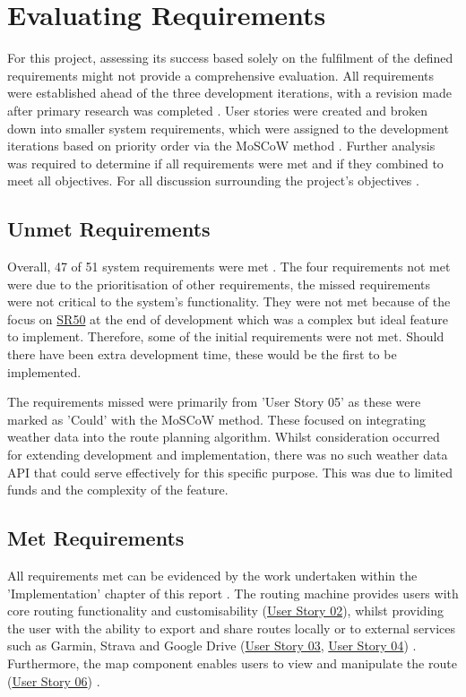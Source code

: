 \clearpage
\section{Evaluating Requirements}
\label{evaluation:requirements}

For this project, assessing its success based solely on the fulfilment of the defined requirements might not provide a comprehensive evaluation. All requirements were established ahead of the three development iterations, with a revision made after primary research was completed . User stories were created and broken down into smaller system requirements, which were assigned to the development iterations based on priority order via the MoSCoW method . Further analysis was required to determine if all requirements were met and if they combined to meet all objectives. For all discussion surrounding the project's objectives .

\subsection{Unmet Requirements}
Overall, 47 of 51 system requirements were met . The four requirements not met were due to the prioritisation of other requirements, the missed requirements were not critical to the system's functionality. They were not met because of the focus on \hyperref[SR:50]{SR50} at the end of development which was a complex but ideal feature to implement. Therefore, some of the initial requirements were not met. Should there have been extra development time, these would be the first to be implemented.

The requirements missed were primarily from 'User Story 05'  as these were marked as 'Could' with the MoSCoW method. These focused on integrating weather data into the route planning algorithm. Whilst consideration occurred for extending development and implementation, there was no such weather data API that could serve effectively for this specific purpose. This was due to limited funds and the complexity of the feature.

\subsection{Met Requirements}
\label{evaluation:requirements:met}
All requirements met can be evidenced by the work undertaken within the 'Implementation' chapter of this report . The routing machine provides users with core routing functionality and customisability (\hyperref[tab:user-story-02]{User Story 02}), whilst providing the user with the ability to export and share routes locally or to external services such as Garmin, Strava and Google Drive (\hyperref[tab:user-story-03]{User Story 03}, \hyperref[tab:user-story-04]{User Story 04}) . Furthermore, the map component enables users to view and manipulate the route (\hyperref[tab:user-story-06]{User Story 06}) .

